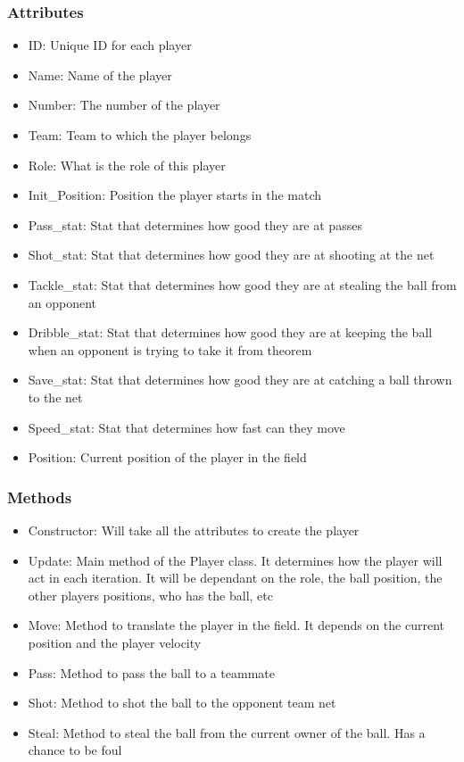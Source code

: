 \documentclass{article}
\theoremstyle{mytheoremstyle}
\theoremstyle{mytheoremstyle}
\theoremstyle{myproblemstyle}
\begin{document}
    \subsubsection{Attributes}
    \begin{itemize}
        \item ID: Unique ID for each player
        \item Name: Name of the player
        \item Number: The number of the player
        \item Team: Team to which the player belongs
        \item Role: What is the role of this player
        \item Init\_Position: Position the player starts in the match
        \item Pass\_stat: Stat that determines how good they are at passes
        \item Shot\_stat: Stat that determines how good they are at shooting at the net
        \item Tackle\_stat: Stat that determines how good they are at stealing the ball from an opponent
        \item Dribble\_stat: Stat that determines how good they are at keeping the ball when an opponent is trying to take it from theorem
        \item Save\_stat: Stat that determines how good they are at catching a ball thrown to the net
        \item Speed\_stat: Stat that determines how fast can they move
        \item Position: Current position of the player in the field
    \end{itemize}

    \subsubsection{Methods}
    \begin{itemize}
        \item Constructor: Will take all the attributes to create the player
        \item Update: Main method of the Player class. It determines how the player will act in each iteration. It will be dependant on the role, the ball position, the other players positions, who has the ball, etc
        \item Move: Method to translate the player in the field. It depends on the current position and the player velocity
        \item Pass: Method to pass the ball to a teammate
        \item Shot: Method to shot the ball to the opponent team net
        \item Steal: Method to steal the ball from the current owner of the ball. Has a chance to be foul 
    \end{itemize}
\end{document}
